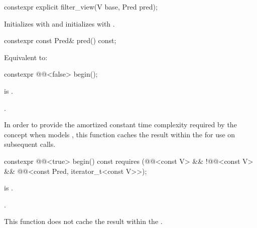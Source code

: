 %
\begin{itemdecl}
constexpr explicit filter_view(V base, Pred pred);
\end{itemdecl}

\begin{itemdescr}
\pnum
\effects
Initializes  with  and initializes
 with .
\end{itemdescr}

%
\begin{itemdecl}
constexpr const Pred& pred() const;
\end{itemdecl}

\begin{itemdescr}
\pnum
\effects
Equivalent to: 
\end{itemdescr}

%
\begin{itemdecl}
constexpr @@<false> begin();
\end{itemdecl}

\begin{itemdescr}
\pnum
\expects
{} is .

\pnum
\returns
{}.

\pnum
\remarks
In order to provide the amortized constant time complexity required by
the  concept
when  models ,
this function caches the result within the
 for use on subsequent calls.
\end{itemdescr}

%
\begin{itemdecl}
constexpr @@<true> begin() const
  requires (@@<const V> && !@@<const V> &&
            @@<const Pred, iterator_t<const V>>);
\end{itemdecl}

\begin{itemdescr}
\pnum
\expects
{} is .

\pnum
\returns
{}.
\begin{note}
This function does not cache the result within the .
\end{note}
\end{itemdescr}

